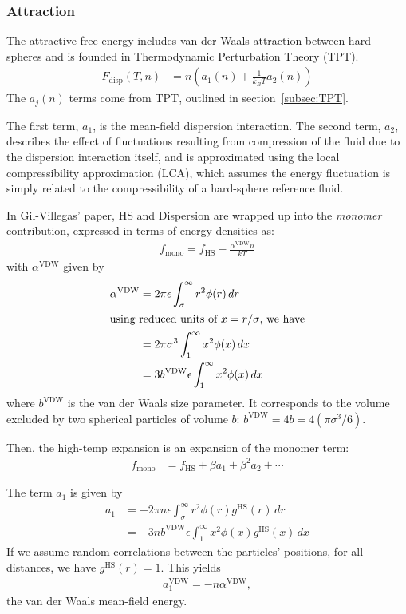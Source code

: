 \documentclass[letterpaper,twocolumn,amsmath,amssymb,prb]{revtex4-1}
\newcommand{\kT}{\ensuremath{k_BT}}
\newcommand{\fdisp}{\ensuremath{F_\text{disp}(T,n)}}
\newcommand{\1}{\ensuremath{\textbf{r}_1}}
\newcommand{\2}{\ensuremath{\textbf{r}_2}}
\newcommand{\3}{\ensuremath{\textbf{r}_3}}
\newcommand{\4}{\ensuremath{\textbf{r}_4}}
\begin{document}
\subsubsection{Attraction}\label{sub2sec:disp}
The attractive free energy includes van der Waals attraction between
hard spheres and is founded in Thermodynamic Perturbation Theory
(TPT).
\begin{align}
  \fdisp &= n \left( a_1(n) + \frac{1}{\kT}a_2(n) \right)
\end{align}
The $a_j(n)$ terms come from TPT, outlined in section~\ref{subsec:TPT}.

The first term, $a_1$, is the mean-field dispersion interaction. The
second term, $a_2$, describes the effect of fluctuations resulting
from compression of the fluid due to the dispersion interaction
itself, and is approximated using the local compressibility
approximation (LCA), which assumes the energy fluctuation is simply
related to the compressibility of a hard-sphere reference
fluid.\cite{Barker76}

In Gil-Villegas' paper,\cite{gil-villegas97} HS and Dispersion are wrapped up into the
\textit{monomer} contribution, expressed in terms of energy densities
as:
\begin{align}
  f_\text{mono} = f_\text{HS} - \frac{\alpha^\text{VDW}n}{kT}
\end{align}
with $\alpha^\text{VDW}$ given by
\begin{align}
  \alpha^\text{VDW} &= 2\pi\epsilon\int_\sigma^\infty r^2\phi(r)\,dr \\
  \intertext{using reduced units of $x = r/\sigma$, we have}
  &= 2\pi\sigma^3\int_1^\infty x^2\phi(x)\,dx \\
  &= 3b^\text{VDW}\epsilon\int_1^\infty x^2\phi(x)\,dx
\end{align}
where $b^\text{VDW}$ is the van der Waals size parameter. It
corresponds to the volume excluded by two spherical particles of
volume $b$: $b^\text{VDW} = 4b = 4\left(\pi\sigma^3/6\right)$.

Then, the high-temp expansion is an expansion of the monomer term:
\begin{align}
  f_\text{mono} &= f_\text{HS} + \beta a_1 + \beta^2 a_2 + \cdots
\end{align}

The term $a_1$ is given by
\begin{align}
  a_1 &= -2\pi n \epsilon\int_\sigma^\infty r^2\phi(r)g^\text{HS}(r)\,dr \\
  &= -3 n  b^\text{VDW}\epsilon\int_1^\infty x^2\phi(x)g^\text{HS}(x)\,dx
\end{align}
If we assume random correlations between the particles' positions, for
all distances, we have $g^\text{HS}(r) = 1$. This yields
\begin{align}
  a_1^\text{VDW} = - n \alpha^\text{VDW},
\end{align}
the van der Waals mean-field energy.
\end{document}
